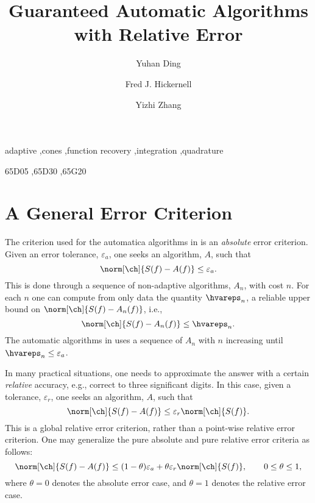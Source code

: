 \documentclass[]{elsarticle}
\theoremstyle{definition}
\theoremstyle{remark}
\begin{document}
\begin{frontmatter}

\title{Guaranteed Automatic Algorithms with Relative Error}
\author{Yuhan Ding}
\author{Fred J. Hickernell}
\author{Yizhi Zhang}
\address{Room E1-208, Department of Applied Mathematics, Illinois Institute of Technology,\\ 10 W.\ 32$^{\text{nd}}$ St., Chicago, IL 60616}
\begin{abstract}
\end{abstract}

\begin{keyword}
adaptive \sep cones \sep function recovery \sep integration \sep quadrature

\MSC[2010] 65D05 \sep 65D30 \sep 65G20

\end{keyword}
\end{frontmatter}


\section{A General Error Criterion} \label{relerrsec}

The criterion used for the automatica algorithms in \cite{HicEtal14b} is an \emph{absolute} error criterion. Given an error tolerance, $\varepsilon_a$, one seeks an algorithm, $A$, such that
\begin{equation} \label{abserrcrit}
\norm[\ch]{S(f)-A(f)} \le \varepsilon_a.
\end{equation}
This is done through a sequence of non-adaptive algorithms, $A_n$, with cost $n$.  For each $n$ one can compute from only data the quantity $\hvareps_n$, a reliable upper bound on $\norm[\ch]{S(f)-A_n(f)}$, i.e.,
\begin{equation} \label{hatvareps}
\norm[\ch]{S(f)-A_n(f)} \le \hvareps_n.
\end{equation}
The automatic algorithms in \cite{HicEtal14b} uses a sequence of $A_n$ with $n$ increasing until $\hvareps_n \le \varepsilon_a$.

In many practical situations, one needs to approximate the answer with a certain \emph{relative} accuracy, e.g., correct to three significant digits.  In this case, given a tolerance, $\varepsilon_r$, one seeks an algorithm, $A$, such that
\begin{equation} \label{globalrelerrcrit}
\norm[\ch]{S(f)-A(f)} \le \varepsilon_r \norm[\ch]{S(f)}.
\end{equation}
This is a global relative error criterion, rather than a point-wise relative error criterion.  One may generalize the pure absolute and pure relative error criteria as follows:
\begin{equation} \label{globalgenerrcrit}
\norm[\ch]{S(f)-A(f)} \le (1-\theta)\varepsilon_a + \theta \varepsilon_r \norm[\ch]{S(f)}, \qquad 0 \le \theta \le 1,
\end{equation}
where $\theta=0$ denotes the absolute error case, and $\theta=1$ denotes the relative error case.  
\end{document}
